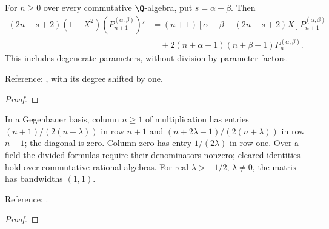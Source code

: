 \begin{supporting}
\begin{theorem}
\label{thm:jacobi-derivative-lowering}
\leanok
For $n\ge0$ over every commutative $\Q$-algebra, put $s=\alpha+\beta$. Then
\begin{align*}
 (2n+s+2)(1-X^2)(P_{n+1}^{(\alpha,\beta)})'
 &= (n+1)[\alpha-\beta-(2n+s+2)X]P_{n+1}^{(\alpha,\beta)}\\
 &\quad+2(n+\alpha+1)(n+\beta+1)P_n^{(\alpha,\beta)}.
\end{align*}
This includes degenerate parameters, without division by parameter factors.

Reference: \cite[18.9.17]{dlmf}, with its degree shifted by one.
\end{theorem}
\begin{proof}
\leanok
\end{proof}
\end{supporting}


\begin{theorem}
\label{thm:gegenbauer-multiplication-matrix}
\leanok
In a Gegenbauer basis, column $n\ge1$ of multiplication has entries
$(n+1)/(2(n+\lambda))$ in row $n+1$ and
$(n+2\lambda-1)/(2(n+\lambda))$ in row $n-1$; the diagonal is zero.
Column zero has entry $1/(2\lambda)$ in row one.
Over a field the divided formulas require their denominators nonzero;
cleared identities hold over commutative rational algebras.
For real $\lambda>-1/2$, $\lambda\ne0$, the matrix has bandwidths $(1,1)$.

Reference: \cite[18.9.1, Table 18.9.1]{dlmf}.
\end{theorem}
\begin{proof}
\leanok
\end{proof}


